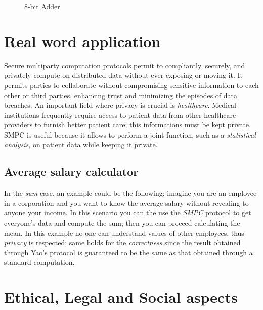 \documentclass[12pt]{article}
\begin{document}
\begin{figure}[!h]
    \caption{8-bit Adder}\label{circuit}
\end{figure}

\section{Real word application}\label{sec:world}
Secure multiparty computation protocols permit to compliantly, securely, and privately compute on distributed data without ever exposing or moving it. It permits parties to collaborate without compromising sensitive information to each other or third parties, enhancing trust and minimizing the episodes of data breaches. An important field where privacy is crucial is \textit{healthcare}. Medical institutions frequently require access to patient data from other healthcare providers to furnish better patient care; this informations must be kept private. SMPC is useful because it allows to perform a joint function, such as a \textit{statistical analysis}, on patient data while keeping it private.
\subsection{Average salary calculator}
In the \textit{sum} case, an example could be the following: imagine you are an employee in a corporation and you want to know the average salary without revealing to anyone your income. In this scenario you can the use the \textit{SMPC} protocol to get everyone's data and compute the sum; then you can proceed calculating the mean. In this example no one can understand values of other employees, thus \textit{privacy} is respected; same holds for the \textit{correctness} since the result obtained through Yao's protocol is guaranteed to be the same as that obtained through a standard computation.
\section{Ethical, Legal and Social aspects}\label{sec:sel}
\end{document}
